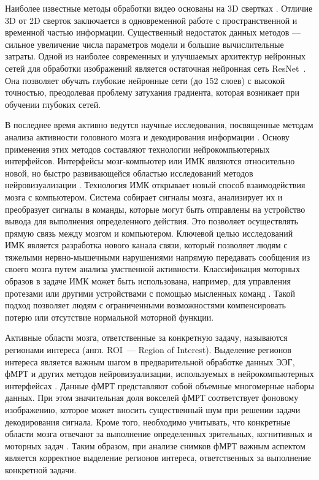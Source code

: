 Наиболее известные методы обработки видео основаны на 3D свертках \cite{tran2015learning}.
Отличие 3D от 2D сверток заключается в одновременной работе с пространственной и временной частью
информации. Существенный недостаток данных методов — сильное увеличение числа параметров модели и
большие вычислительные затраты. Одной из наиболее современных и улучшаемых архитектур
нейронных сетей для обработки изображений является остаточная нейронная сеть ResNet~\cite{he2015deep}.
Она позволяет обучать глубокие нейронные сети (до 152 слоев) с высокой точностью,
преодолевая проблему затухания градиента, которая возникает при обучении глубоких сетей.

В последнее время активно ведутся научные исследования,
посвященные методам анализа активности головного мозга и декодирования информации \cite{siuly2016eeg, yuan2021bci, du2022fmri}. Основу применения этих методов составляют технологии нейрокомпьютерных интерфейсов.
Интерфейсы мозг-компьютер или ИМК являются относительно новой, но быстро развивающейся областью исследований методов нейровизуализации \cite{bularka2016brain}.
Технология ИМК открывает новый способ взаимодействия мозга с компьютером.
Система собирает сигналы мозга, анализирует их и преобразует сигналы в команды, которые могут быть отправлены на устройство
вывода для выполнения определенного действия.
Это позволяет осуществлять прямую связь между мозгом и компьютером.
Ключевой целью исследований ИМК является разработка нового канала связи,
который позволяет людям с тяжелыми нервно-мышечными нарушениями напрямую передавать сообщения из своего мозга путем анализа умственной активности.
Классификация моторных образов в задаче ИМК может быть использована, например, для управления протезами или другими устройствами с
помощью мысленных команд \cite{song2020assistive, cruz2021self, schwarz2020decoding}. Такой подход позволяет людям с ограниченными возможностями компенсировать потерю или отсутствие нормальной моторной функции.

Активные области мозга, ответственные за конкретную задачу, называются регионами интереса (англ. ROI~--- Region of Interest). Выделение регионов интереса является важным шагом в предварительной обработке данных ЭЭГ, фМРТ и других методов нейровизуализации, используемых в нейрокомпьютерных интерфейсах \cite{poldrack2007region}. Данные фМРТ представляют собой объемные многомерные наборы данных.
При этом значительная доля вокселей фМРТ соответствует фоновому изображению, которое может вносить существенный шум при решении задачи декодирования сигнала.
Кроме того, необходимо учитывать, что конкретные области мозга отвечают за выполнение определенных зрительных, когнитивных и моторных задач \cite{altenmuller2002brain}.
Таким образом, при анализе снимков фМРТ важным аспектом является корректное выделение регионов интереса, ответственных за выполнение конкретной задачи.

